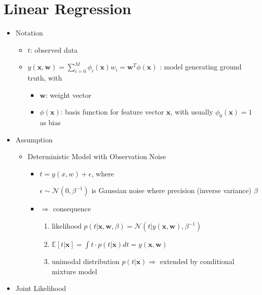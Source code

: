 \section{Linear Regression}

\begin{itemize}

\item Notation
	\begin{itemize}
	\item $t$: observed data
	\item $\displaystyle y(\mathbf x,\mathbf w)=\sum_{i=0}^{M}\phi_i(\mathbf x)w_i = \mathbf w^T \phi(\mathbf x)$ : model generating ground truth, with
		\begin{itemize}
		\item $\mathbf w$: weight vector
		\item $\phi(\mathbf x)$: basis function for feature vector $\mathbf x$, with usually $\phi_0(\mathbf x) = 1$ as bias
		\end{itemize}
	\end{itemize}

\item Assumption
	\begin{itemize}
	\item Deterministic Model with Observation Noise
		\begin{itemize}
		\item \(t=y(x,w)+\epsilon\), where
		
		$\epsilon \sim \mathcal N(0,\beta^{-1})$ is Gaussian noise where precision (inverse variance) $\beta$
		\item $\Rightarrow$ consequence
			\begin{enumerate}
			\item $\text{likelihood } p(t|\mathbf x,\mathbf w,\beta) = \mathcal N(t|y(\mathbf x,\mathbf w), \beta^{-1})$
			\item $\mathbb E[t|\mathbf x] = \int t\cdot p(t|\mathbf x) dt = y(\mathbf x, \mathbf w) $
			\item unimodal distribution $p(t|\mathbf x) \Rightarrow$ extended by conditional mixture model
			\end{enumerate}

		\end{itemize}
	\end{itemize}

\item Joint Likelihood


\end{itemize}
